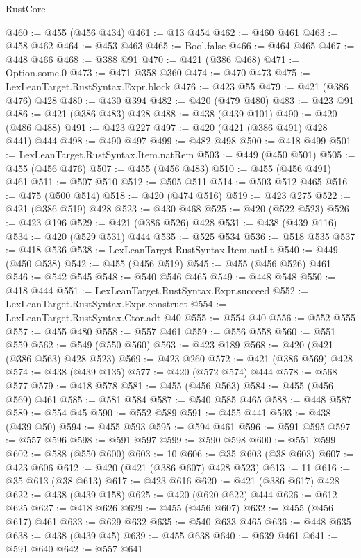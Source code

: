 \begin{lexlean}{RustCore}
\begin{coremodule}
@460 := @455 (@456 @434)
@461 := @13 @454
@462 := @460 @461
@463 := @458 @462
@464 := @453 @463
@465 := Bool.false
@466 := @464 @465
@467 := @448 @466
@468 := @388 @91
@470 := @421 (@386 @468)
@471 := Option.some.{0}
@473 := @471 @358 @360
@474 := @470 @473
@475 := LexLeanTarget.RustSyntax.Expr.block
@476 := @423 @55
@479 := @421 (@386 @476) @428
@480 := @430 @394
@482 := @420 (@479 @480)
@483 := @423 @91
@486 := @421 (@386 @483) @428
@488 := @438 (@439 @101)
@490 := @420 (@486 @488)
@491 := @423 @227
@497 := @420 (@421 (@386 @491) @428 @441) @444
@498 := @490 @497
@499 := @482 @498
@500 := @418 @499
@501 := LexLeanTarget.RustSyntax.Item.natRem
@503 := @449 (@450 @501)
@505 := @455 (@456 @476)
@507 := @455 (@456 @483)
@510 := @455 (@456 @491) @461
@511 := @507 @510
@512 := @505 @511
@514 := @503 @512 @465
@516 := @475 (@500 @514)
@518 := @420 (@474 @516)
@519 := @423 @275
@522 := @421 (@386 @519) @428
@523 := @430 @468
@525 := @420 (@522 @523)
@526 := @423 @196
@529 := @421 (@386 @526) @428
@531 := @438 (@439 @116)
@534 := @420 (@529 @531) @444
@535 := @525 @534
@536 := @518 @535
@537 := @418 @536
@538 := LexLeanTarget.RustSyntax.Item.natLt
@540 := @449 (@450 @538)
@542 := @455 (@456 @519)
@545 := @455 (@456 @526) @461
@546 := @542 @545
@548 := @540 @546 @465
@549 := @448 @548
@550 := @418 @444
@551 := LexLeanTarget.RustSyntax.Expr.succeed
@552 := LexLeanTarget.RustSyntax.Expr.construct
@554 := LexLeanTarget.RustSyntax.Ctor.adt @40
@555 := @554 @40
@556 := @552 @555
@557 := @455 @480
@558 := @557 @461
@559 := @556 @558
@560 := @551 @559
@562 := @549 (@550 @560)
@563 := @423 @189
@568 := @420 (@421 (@386 @563) @428 @523)
@569 := @423 @260
@572 := @421 (@386 @569) @428
@574 := @438 (@439 @135)
@577 := @420 (@572 @574) @444
@578 := @568 @577
@579 := @418 @578
@581 := @455 (@456 @563)
@584 := @455 (@456 @569) @461
@585 := @581 @584
@587 := @540 @585 @465
@588 := @448 @587
@589 := @554 @45
@590 := @552 @589
@591 := @455 @441
@593 := @438 (@439 @50)
@594 := @455 @593
@595 := @594 @461
@596 := @591 @595
@597 := @557 @596
@598 := @591 @597
@599 := @590 @598
@600 := @551 @599
@602 := @588 (@550 @600)
@603 := 10
@606 := @35 @603 (@38 @603)
@607 := @423 @606
@612 := @420 (@421 (@386 @607) @428 @523)
@613 := 11
@616 := @35 @613 (@38 @613)
@617 := @423 @616
@620 := @421 (@386 @617) @428
@622 := @438 (@439 @158)
@625 := @420 (@620 @622) @444
@626 := @612 @625
@627 := @418 @626
@629 := @455 (@456 @607)
@632 := @455 (@456 @617) @461
@633 := @629 @632
@635 := @540 @633 @465
@636 := @448 @635
@638 := @438 (@439 @45)
@639 := @455 @638
@640 := @639 @461
@641 := @591 @640
@642 := @557 @641

\end{coremodule}
\end{lexlean}
